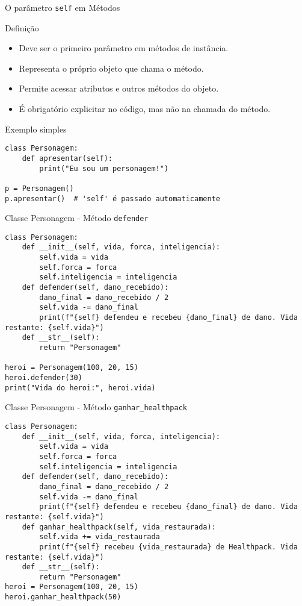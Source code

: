 \begin{frame}[fragile]{O parâmetro \texttt{self} em Métodos}

\begin{block}{Definição}
\begin{itemize}
    \item Deve ser o primeiro parâmetro em métodos de instância.
    \item Representa o próprio objeto que chama o método.
    \item Permite acessar atributos e outros métodos do objeto.
    \item É obrigatório explicitar no código, mas não na chamada do método.
\end{itemize}
\end{block}

\begin{exampleblock}{Exemplo simples}
\begin{verbatim}
class Personagem:
    def apresentar(self):
        print("Eu sou um personagem!")

p = Personagem()
p.apresentar()  # 'self' é passado automaticamente
\end{verbatim}
\end{exampleblock}

\end{frame}
\begin{frame}[fragile]{Classe Personagem - Método \texttt{defender}}

\begin{verbatim}
class Personagem:
    def __init__(self, vida, forca, inteligencia):
        self.vida = vida
        self.forca = forca
        self.inteligencia = inteligencia
    def defender(self, dano_recebido):
        dano_final = dano_recebido / 2
        self.vida -= dano_final
        print(f"{self} defendeu e recebeu {dano_final} de dano. Vida restante: {self.vida}")
    def __str__(self):
        return "Personagem"

heroi = Personagem(100, 20, 15)
heroi.defender(30)
print("Vida do heroi:", heroi.vida)
\end{verbatim}

\end{frame}

\begin{frame}[fragile]{Classe Personagem - Método \texttt{ganhar\_healthpack}}

\begin{verbatim}
class Personagem:
    def __init__(self, vida, forca, inteligencia):
        self.vida = vida
        self.forca = forca
        self.inteligencia = inteligencia
    def defender(self, dano_recebido):
        dano_final = dano_recebido / 2
        self.vida -= dano_final
        print(f"{self} defendeu e recebeu {dano_final} de dano. Vida restante: {self.vida}")
    def ganhar_healthpack(self, vida_restaurada):
        self.vida += vida_restaurada
        print(f"{self} recebeu {vida_restaurada} de Healthpack. Vida restante: {self.vida}")
    def __str__(self):
        return "Personagem"
heroi = Personagem(100, 20, 15)
heroi.ganhar_healthpack(50)
\end{verbatim}

\end{frame}


